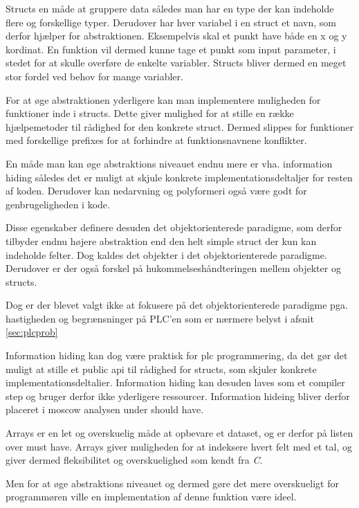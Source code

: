  Structs en måde at gruppere data således man har en type der kan indeholde flere og forskellige typer. Derudover har hver variabel i en struct et navn, som derfor hjælper for abstraktionen. Eksempelvis skal et punkt have både en x og y kordinat. En funktion vil dermed kunne tage et punkt som input parameter, i stedet for at skulle overføre de enkelte variabler. Structs bliver dermed en meget stor fordel ved behov for mange variabler.

For at øge abstraktionen yderligere kan man implementere muligheden for funktioner inde i structs. Dette giver mulighed for at stille en række hjælpemetoder til rådighed for den konkrete struct. Dermed slippes for funktioner med forskellige prefixes for at forhindre at funktionsnavnene konflikter.

En måde man kan øge abstraktions niveauet endnu mere er vha. information hiding således det er muligt at skjule konkrete implementationsdeltaljer for resten af koden. Derudover kan nedarvning og polyformeri også være godt for genbrugeligheden i kode.

Disse egenskaber definere desuden det objektorienterede paradigme, som derfor tilbyder endnu højere abstraktion end den helt simple struct der kun kan indeholde felter. Dog kaldes det objekter i det objektorienterede paradigme. Derudover er der også forskel på hukommelseshåndteringen mellem objekter og structs.

Dog er der blevet valgt ikke at fokusere på det objektorienterede paradigme pga. hastigheden og begrænsninger på PLC'en som er nærmere belyst i afsnit \ref{sec:plcprob}

Information hiding kan dog være praktisk for \gls{plc} programmering, da det gør det muligt at stille et public api til rådighed for structs, som skjuler konkrete implementationsdeltalier. Information hiding kan desuden laves som et compiler step og bruger derfor ikke yderligere ressourcer. Information hideing bliver derfor placeret i moscow analysen under should have.

Arrays er en let og overskuelig måde at opbevare et dataset, og er derfor på listen over must have. Arrays giver muligheden for at indeksere hvert felt med et tal, og giver dermed fleksibilitet og overskuelighed som kendt fra \textit{C}.

Men for at øge abstraktions niveauet og dermed gøre det mere overskueligt for programmøren ville en implementation af denne funktion være ideel.

